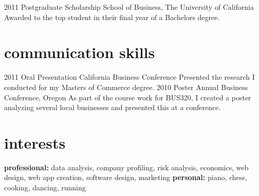\documentclass[]{friggeri-cv} %
\begin{document}
\begin{entrylist}
\entry
{2011}
{Postgraduate Scholarship}
{School of Business, The University of California}
{Awarded to the top student in their final year of a Bachelors degree.}
\end{entrylist}


\section{communication skills}

\begin{entrylist}
\entry
{2011}
{Oral Presentation}
{California Business Conference}
{Presented the research I conducted for my Masters of Commerce degree.}
\entry
{2010}
{Poster}
{Annual Business Conference, Oregon}
{As part of the course work for BUS320, I created a poster analyzing several local businesses and presented this at a conference.}
\end{entrylist}


\section{interests}

\textbf{professional:} data analysis, company profiling, risk analysis, economics, web design, web app creation, software design, marketing \textbf{personal:} piano, chess, cooking, dancing, running

\end{document}
